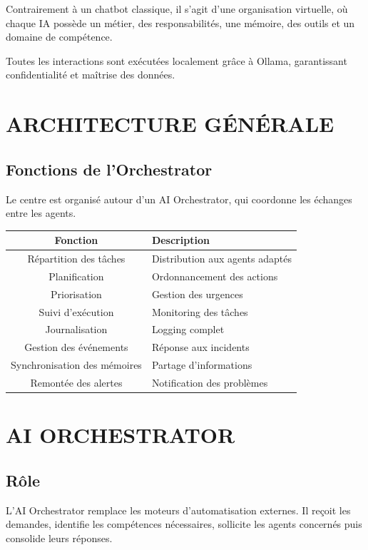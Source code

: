\documentclass[12pt,a4paper,oneside]{book}
\begin{document}
Contrairement à un chatbot classique, il s'agit d'une organisation virtuelle, où chaque IA possède un métier, des responsabilités, une mémoire, des outils et un domaine de compétence.

Toutes les interactions sont exécutées localement grâce à Ollama, garantissant confidentialité et maîtrise des données.

\chapter{ARCHITECTURE GÉNÉRALE}

\section{Fonctions de l'Orchestrator}
Le centre est organisé autour d'un AI Orchestrator, qui coordonne les échanges entre les agents.

\bigskip
\begin{center}
\begin{tabular}{|c|p{10cm}|}
\hline
\rowcolor{electronblue}
\color{white}\textbf{Fonction} & \color{white}\textbf{Description} \\
\hline
Répartition des tâches & Distribution aux agents adaptés \\
\hline
Planification & Ordonnancement des actions \\
\hline
Priorisation & Gestion des urgences \\
\hline
Suivi d'exécution & Monitoring des tâches \\
\hline
Journalisation & Logging complet \\
\hline
Gestion des événements & Réponse aux incidents \\
\hline
Synchronisation des mémoires & Partage d'informations \\
\hline
Remontée des alertes & Notification des problèmes \\
\hline
\end{tabular}
\end{center}

\chapter{AI ORCHESTRATOR}

\section{Rôle}
L'AI Orchestrator remplace les moteurs d'automatisation externes. Il reçoit les demandes, identifie les compétences nécessaires, sollicite les agents concernés puis consolide leurs réponses.
\end{document}
